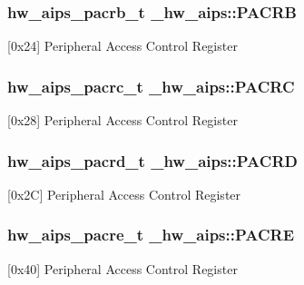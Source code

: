 \subsubsection[{\texorpdfstring{P\+A\+C\+RB}{PACRB}}]{ {\bf hw\+\_\+aips\+\_\+pacrb\+\_\+t} \+\_\+hw\+\_\+aips\+::\+P\+A\+C\+RB}\hypertarget{struct__hw__aips_ab8445998a229b89bbda4b6edcf406bc1}{}\label{struct__hw__aips_ab8445998a229b89bbda4b6edcf406bc1}
\mbox{[}0x24\mbox{]} Peripheral Access Control Register 
\subsubsection[{\texorpdfstring{P\+A\+C\+RC}{PACRC}}]{ {\bf hw\+\_\+aips\+\_\+pacrc\+\_\+t} \+\_\+hw\+\_\+aips\+::\+P\+A\+C\+RC}\hypertarget{struct__hw__aips_a160ef913a3002da852e368f5d54d52d0}{}\label{struct__hw__aips_a160ef913a3002da852e368f5d54d52d0}
\mbox{[}0x28\mbox{]} Peripheral Access Control Register 
\subsubsection[{\texorpdfstring{P\+A\+C\+RD}{PACRD}}]{ {\bf hw\+\_\+aips\+\_\+pacrd\+\_\+t} \+\_\+hw\+\_\+aips\+::\+P\+A\+C\+RD}\hypertarget{struct__hw__aips_abcaf27dba00b199b3bd2007042c16910}{}\label{struct__hw__aips_abcaf27dba00b199b3bd2007042c16910}
\mbox{[}0x2C\mbox{]} Peripheral Access Control Register 
\subsubsection[{\texorpdfstring{P\+A\+C\+RE}{PACRE}}]{ {\bf hw\+\_\+aips\+\_\+pacre\+\_\+t} \+\_\+hw\+\_\+aips\+::\+P\+A\+C\+RE}\hypertarget{struct__hw__aips_ad9c0496d1401e83dfadd92aeee814147}{}\label{struct__hw__aips_ad9c0496d1401e83dfadd92aeee814147}
\mbox{[}0x40\mbox{]} Peripheral Access Control Register 
